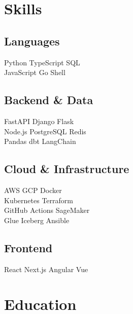 \documentclass[]{plushcv}
\begin{document}
\hfill
\begin{minipage}[t]{0.25\textwidth} 


\section{Skills}
\subsection{Languages}
\sectionsep
Python \textbullet{} TypeScript \textbullet{} SQL \textbullet{} \\
JavaScript \textbullet{} Go \textbullet{} Shell \\
\sectionsep
\sectionsep
\subsection{Backend \& Data}
\sectionsep
FastAPI \textbullet{} Django \textbullet{} Flask \textbullet{} \\
Node.js \textbullet{} PostgreSQL \textbullet{} Redis \textbullet{} \\
Pandas \textbullet{} dbt \textbullet{} LangChain \\
\sectionsep
\sectionsep
\subsection{Cloud \& Infrastructure}
\sectionsep
AWS \textbullet{} GCP \textbullet{} Docker \textbullet{} \\
Kubernetes \textbullet{} Terraform \textbullet{} \\
GitHub Actions \textbullet{} SageMaker \textbullet{} \\
Glue \textbullet{} Iceberg \textbullet{} Ansible \\
\sectionsep
\sectionsep
\subsection{Frontend}
\sectionsep
React \textbullet{} Next.js \textbullet{} Angular \textbullet{} Vue \\

\sectionsep


\section{Education} 

\end{minipage}
\end{document}
